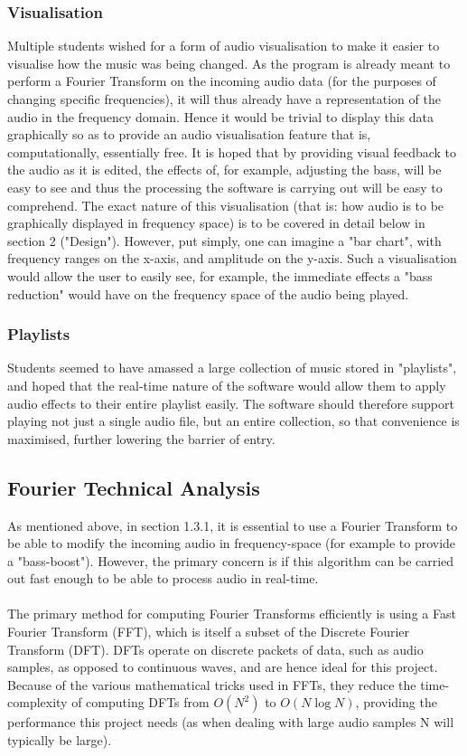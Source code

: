 \subsubsection{Visualisation}
Multiple students wished for a form of audio visualisation to make it easier to visualise how the music was being changed. As the program is already meant to perform a Fourier Transform on the incoming audio data (for the purposes of changing specific frequencies), it will thus already have a representation of the audio in the frequency domain. Hence it would be trivial to display this data graphically so as to provide an audio visualisation feature that is, computationally, essentially free. It is hoped that by providing visual feedback to the audio as it is edited, the effects of, for example, adjusting the bass, will be easy to see and thus the processing the software is carrying out will be easy to comprehend. The exact nature of this visualisation (that is: how audio is to be graphically displayed in frequency space) is to be covered in detail below in section 2 ("Design"). However, put simply, one can imagine  a "bar chart", with frequency ranges on the x-axis, and amplitude on the y-axis. Such a visualisation would allow the user to easily see, for example, the immediate effects a "bass reduction" would have on the frequency space of the audio being played.

\subsubsection{Playlists}
Students seemed to have amassed a large collection of music stored in "playlists", and hoped that the real-time nature of the software would allow them to apply audio effects to their entire playlist easily. The software should therefore support playing not just a single audio file, but an entire collection, so that convenience is maximised, further lowering the barrier of entry.

\pagebreak
\subsection{Fourier Technical Analysis}
As mentioned above, in section 1.3.1, it is essential to use a Fourier Transform to be able to modify the incoming audio in frequency-space (for example to provide a "bass-boost"). However, the primary concern is if this algorithm can be carried out fast enough to be able to process audio in real-time.

\paragraph{}
The primary method for computing Fourier Transforms efficiently is using a Fast Fourier Transform (FFT), which is itself a subset of the Discrete Fourier Transform (DFT). DFTs operate on discrete packets of data, such as audio samples, as opposed to continuous waves, and are hence ideal for this project. Because of the various mathematical tricks used in FFTs, they reduce the time-complexity of computing DFTs from \(O(N^2)\) to \(O(N\log{N})\), providing the performance this project needs (as when dealing with large audio samples N will typically be large).

